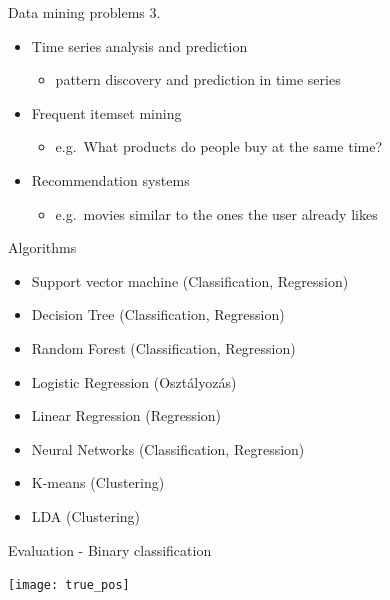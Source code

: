 \documentclass[bigger]{beamer}
\begin{document}
\begin{frame}{Data mining problems 3.}
    \begin{itemize}
        \item Time series analysis and prediction
            \begin{itemize}
                \item pattern discovery and prediction in time series
            \end{itemize}
        \item Frequent itemset mining
            \begin{itemize}
                \item e.g.~What products do people buy at the same time?
            \end{itemize}
        \item Recommendation systems
            \begin{itemize}
                \item e.g.~movies similar to the ones the user already likes
            \end{itemize}
    \end{itemize}
\end{frame}

\begin{frame}{Algorithms}
	\begin{itemize}
		\item Support vector machine (Classification, Regression)
		\item Decision Tree (Classification, Regression)
		\item Random Forest (Classification, Regression)
		\item Logistic Regression (Osztályozás)
		\item Linear Regression (Regression)
		\item Neural Networks (Classification, Regression)
		\item K-means (Clustering)
		\item LDA (Clustering)
	\end{itemize}
\end{frame}

\begin{frame}{Evaluation - Binary classification}
    \begin{center}
\texttt{[image: true\_pos]}
    \end{center}
\end{frame}
\end{document}
